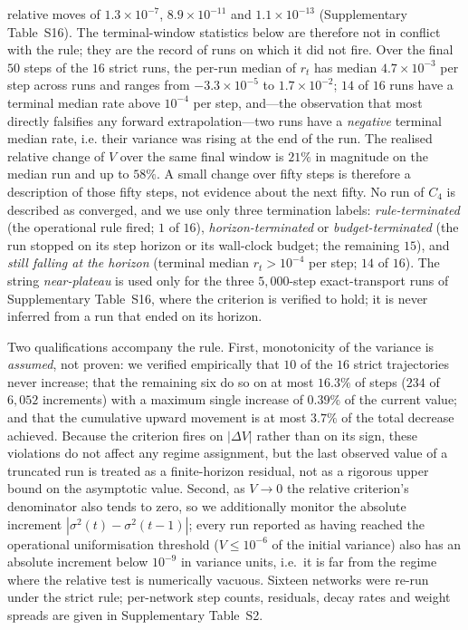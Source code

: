 \documentclass[11pt]{article}
\begin{document}
relative moves of $1.3\times10^{-7}$, $8.9\times10^{-11}$ and
$1.1\times10^{-13}$ (Supplementary Table~S16). The terminal-window statistics
below are therefore not in conflict with the rule; they are the record of runs
on which it did not fire. Over the final $50$ steps of the $16$ strict runs,
the per-run median of $r_t$ has median $4.7\times10^{-3}$ per step across runs
and ranges from $-3.3\times10^{-5}$ to $1.7\times10^{-2}$; $14$ of $16$ runs
have a terminal median rate above $10^{-4}$ per step, and---the observation
that most directly falsifies any forward extrapolation---two runs have a
\emph{negative} terminal median rate, i.e. their variance was rising at the
end of the run. The realised relative change of $V$ over the same final window
is $21\%$ in magnitude on the median run and up to $58\%$. A small change over
fifty steps is therefore a description of those fifty steps, not evidence about
the next fifty. No run of $C_4$ is described as converged, and we use only three
termination labels: \emph{rule-terminated} (the operational rule fired; $1$ of
$16$), \emph{horizon-terminated} or \emph{budget-terminated} (the run stopped
on its step horizon or its wall-clock budget; the remaining $15$), and
\emph{still falling at the horizon} (terminal median $r_t>10^{-4}$ per step;
$14$ of $16$). The string \emph{near-plateau} is used only for the three
$5{,}000$-step exact-transport runs of Supplementary Table~S16, where the
criterion is verified to hold; it is never inferred from a run that ended on its
horizon.

Two qualifications accompany the rule. First, monotonicity of the variance is
\emph{assumed}, not proven: we verified empirically that $10$ of the $16$
strict trajectories never increase; that the remaining six do so on at most
$16.3\%$ of steps ($234$ of $6{,}052$ increments) with a maximum single
increase of $0.39\%$ of the current value; and that the cumulative upward
movement is at most $3.7\%$ of the total decrease achieved. Because the
criterion fires on $|\Delta V|$ rather than on its sign, these violations do
not affect any regime assignment, but the last observed value of a truncated
run is treated as a finite-horizon residual, not as a rigorous upper bound on
the asymptotic value. Second, as $V\to 0$ the relative criterion's
denominator also tends to zero, so we additionally monitor the absolute
increment $|\sigma^2(t)-\sigma^2(t-1)|$; every run reported as having reached
the operational uniformisation threshold ($V \le 10^{-6}$ of the initial
variance) also has an absolute increment below $10^{-9}$ in variance units,
i.e.\ it is far from the regime where the relative test is numerically
vacuous. Sixteen networks were re-run under the strict rule; per-network step
counts, residuals, decay rates and weight spreads are given in Supplementary
Table~S2.
\end{document}
